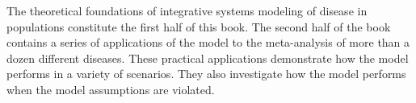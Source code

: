 The theoretical foundations of integrative systems modeling of disease
in populations constitute the first half of this book.  The second
half of the book contains a series of applications of the model to the
meta-analysis of more than a dozen different diseases.  These
practical applications demonstrate how the model performs in a variety
of scenarios. They also investigate how the model performs when the
model assumptions are violated.

